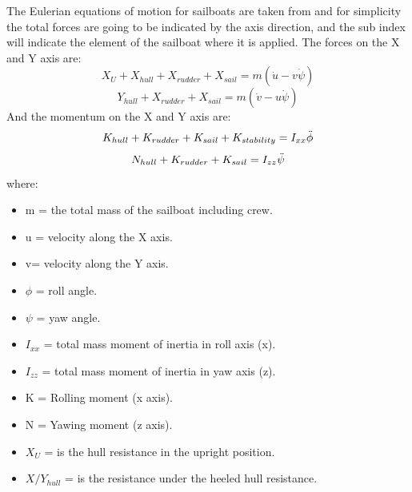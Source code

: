 The Eulerian equations of motion for sailboats are taken from \cite{de2004mathematical} and for simplicity the total forces are going to be indicated by the axis direction, and the sub index will indicate the element of the sailboat where it is applied.\newline
\newline
The forces on the X and Y axis are: 
\begin{equation}\label{eq:force_X_motion}
    X_{U}+X_{hull}+X_{rudder}+X_{sail}=m(\Dot{u}-v\Dot{\psi})
\end{equation}
\begin{equation}\label{eq:force_Y_motion}
    Y_{hull}+X_{rudder}+X_{sail}=m(\Dot{v}-u\Dot{\psi})
\end{equation}
And the momentum on the X and Y axis are:
\begin{equation}\label{eq:moment_X_motion}
    K_{hull}+K_{rudder}+K_{sail}+K_{stability}=I_{xx} \Ddot{\phi}
\end{equation}
\begin{equation}\label{eq:moment_Y_motion}
    N_{hull}+K_{rudder}+K_{sail}=I_{zz} \Ddot{\psi}
\end{equation}
where: 
\begin{itemize}  \label{symbols o motions}
 \setlength \itemsep{0em}
\item m = the total mass of the sailboat including crew.
\item u = velocity along the X axis.
\item v= velocity along the Y axis.
\item $\phi$ = roll angle.
\item $\psi$ = yaw angle.
\item $I_{xx}$ = total mass moment of inertia in roll axis (x).
\item $I_{zz}$ = total mass moment of inertia in yaw axis (z).
\item K = Rolling moment (x axis).
\item N = Yawing moment (z axis).
\item $X_{U}$ = is the hull resistance in the upright position.
\item $X/Y_{hull}$ = is the resistance under the heeled hull resistance.
\end{itemize}

